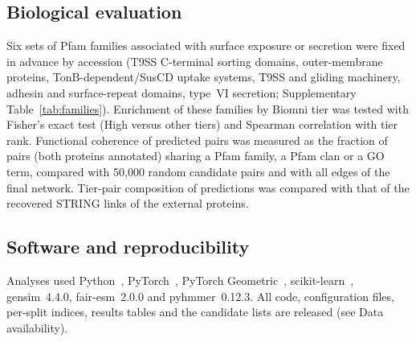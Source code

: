 \documentclass[pdflatex,sn-mathphys-num]{sn-jnl}
\begin{document}
\subsection{Biological evaluation}
Six sets of Pfam families associated with surface exposure or secretion were fixed in advance by accession (T9SS C-terminal sorting domains, outer-membrane proteins, TonB-dependent/SusCD uptake systems, T9SS and gliding machinery, adhesin and surface-repeat domains, type~VI secretion; Supplementary Table~\ref{tab:families}). Enrichment of these families by Biomni tier was tested with Fisher's exact test (High versus other tiers) and Spearman correlation with tier rank. Functional coherence of predicted pairs was measured as the fraction of pairs (both proteins annotated) sharing a Pfam family, a Pfam clan or a GO term, compared with 50,000 random candidate pairs and with all edges of the final network. Tier-pair composition of predictions was compared with that of the recovered STRING links of the external proteins.

\subsection{Software and reproducibility}
Analyses used Python~\pyVersion, PyTorch~\torchVersion, PyTorch Geometric~\pygVersion, scikit-learn~\sklearnVersion, gensim~4.4.0, fair-esm~2.0.0 and pyhmmer~0.12.3. All code, configuration files, per-split indices, results tables and the candidate lists are released (see Data availability).
\end{document}
